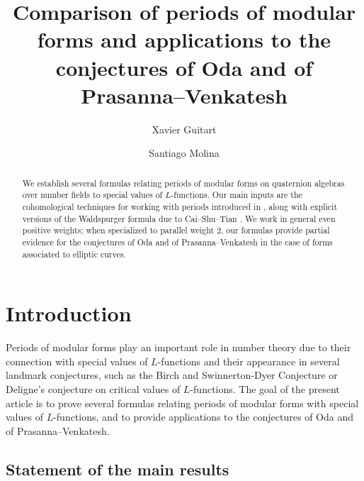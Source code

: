 \documentclass{amsart}
\title[Periods of modular forms and applications to the conjectures of Oda and of Prasanna--Venkatesh]{Comparison of periods of modular forms and  applications to the conjectures of Oda and of Prasanna--Venkatesh}
\author{Xavier Guitart}
\author{Santiago Molina}
\theoremstyle{definition}
\theoremstyle{remark}
\numberwithin{equation}{section}
\begin{document}
\maketitle

\begin{abstract}
  We establish several formulas relating periods of modular forms on quaternion algebras over number fields to special values of $L$-functions. Our main inputs are the cohomological techniques for working with periods introduced in \cite{preprintsanti2}, along with explicit versions of the Waldspurger formula due to Cai--Shu--Tian \cite{CST}. We work in general even positive weights; when specialized to parallel weight 2, our formulas provide partial evidence for the conjectures of Oda and of Prasanna--Venkatesh in the case of forms associated to elliptic curves.
\end{abstract}



\section{Introduction}


 Periods of modular forms play an important role in number theory due to their connection with special values of $L$-functions and their appearance in several landmark conjectures, such as the Birch and Swinnerton-Dyer Conjecture or Deligne's conjecture on critical values of $L$-functions.  The goal of the present article is to prove several formulas relating periods of modular forms with special values of $L$-functions, and to provide applications to the conjectures of Oda and of Prasanna--Venkatesh.

\subsection{Statement of the main results}\label{sec:main results}
 
\end{document}
